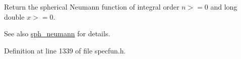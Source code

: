 Return the spherical Neumann function of integral order $ n >= 0 $ and {\ttfamily long double} $ x >= 0 $.

\begin{DoxySeeAlso}{See also}
\hyperlink{group__tr29124__math__spec__func_gae8528a53bb38d600c6c517a7ec10039e}{sph\+\_\+neumann} for details. 
\end{DoxySeeAlso}


Definition at line 1339 of file specfun.\+h.


